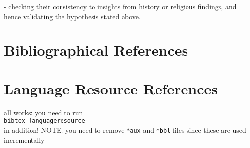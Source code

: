 \documentclass[a4paper,10pt]{article}
\newcommand{\TODO}[1]{\begingroup\color{red}#1\endgroup}
\begin{document}
\TODO{- checking their consistency to insights from history or religious findings, and hence validating the hypothesis stated above.}



\section{Bibliographical References}
\label{main:ref}





\section{Language Resource References}
\label{lr:ref}

\TODO{all works: you need to run\\
\texttt{bibtex languageresource}\\
 in addition! NOTE: you need to remove 
\texttt{*aux} and \texttt{*bbl} files since these are used incrementally }

\end{document}
